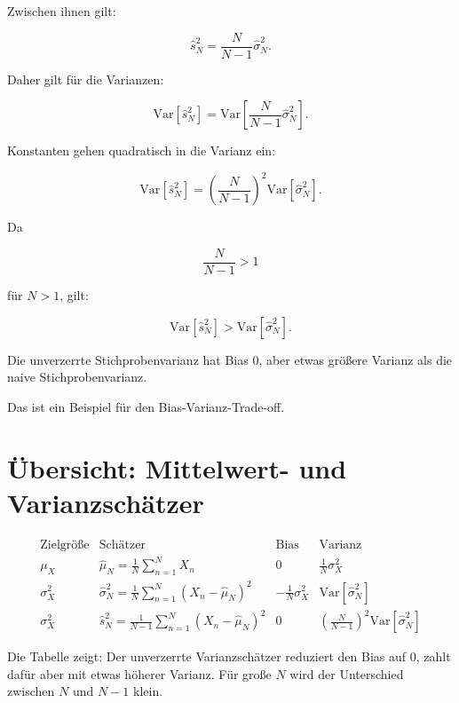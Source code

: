 Zwischen ihnen gilt:

\[
    \hat{s}^2_N
    =
    \frac{N}{N-1}
    \hat{\sigma}^2_N.
\]

Daher gilt für die Varianzen:

\[
    \mathrm{Var}[\hat{s}^2_N]
    =
    \mathrm{Var}\left[
        \frac{N}{N-1}
        \hat{\sigma}^2_N
    \right].
\]

Konstanten gehen quadratisch in die Varianz ein:

\[
    \mathrm{Var}[\hat{s}^2_N]
    =
    \left(
        \frac{N}{N-1}
    \right)^2
    \mathrm{Var}[\hat{\sigma}^2_N].
\]

Da

\[
    \frac{N}{N-1} > 1
\]

für \(N>1\), gilt:

\[
    \mathrm{Var}[\hat{s}^2_N]
    >
    \mathrm{Var}[\hat{\sigma}^2_N].
\]

\begin{conceptbox}
Die unverzerrte Stichprobenvarianz hat Bias \(0\), aber etwas größere Varianz als die naive Stichprobenvarianz.

Das ist ein Beispiel für den Bias-Varianz-Trade-off.
\end{conceptbox}

\section{Übersicht: Mittelwert- und Varianzschätzer}

\[
\begin{array}{c|c|c|c}
\text{Zielgröße}
&
\text{Schätzer}
&
\text{Bias}
&
\text{Varianz}
\\
\hline
\mu_X
&
\hat{\mu}_N
=
\frac{1}{N}\sum_{n=1}^{N}X_n
&
0
&
\frac{1}{N}\sigma_X^2
\\
\hline
\sigma_X^2
&
\hat{\sigma}^2_N
=
\frac{1}{N}
\sum_{n=1}^{N}
(X_n-\hat{\mu}_N)^2
&
-\frac{1}{N}\sigma_X^2
&
\mathrm{Var}[\hat{\sigma}^2_N]
\\
\hline
\sigma_X^2
&
\hat{s}^2_N
=
\frac{1}{N-1}
\sum_{n=1}^{N}
(X_n-\hat{\mu}_N)^2
&
0
&
\left(\frac{N}{N-1}\right)^2
\mathrm{Var}[\hat{\sigma}^2_N]
\end{array}
\]

\begin{notebox}
Die Tabelle zeigt:
Der unverzerrte Varianzschätzer reduziert den Bias auf \(0\), zahlt dafür aber mit etwas höherer Varianz.
Für große \(N\) wird der Unterschied zwischen \(N\) und \(N-1\) klein.
\end{notebox}


